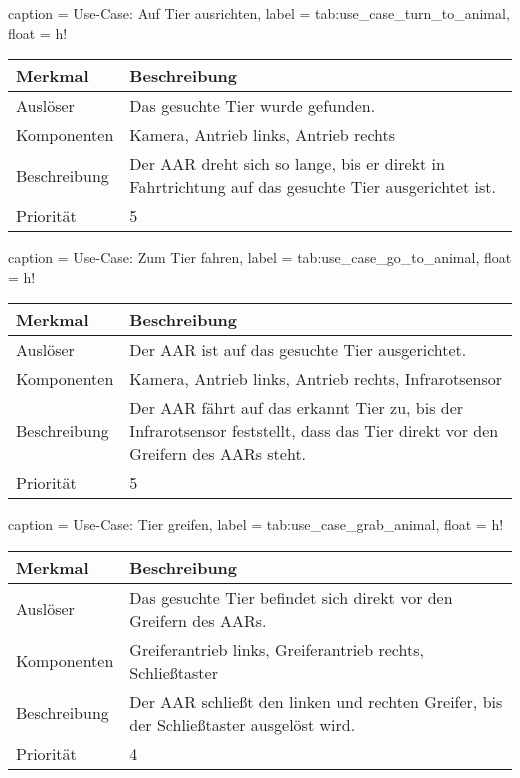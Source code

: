 \begin{dhbwtable}{%
    caption	= Use-Case: Auf Tier ausrichten,
    label	= tab:use_case_turn_to_animal,
    float   = h!
}
    \begin{tabularx}{\textwidth}{lX}
        \toprule
        \textbf{Merkmal}     & \textbf{Beschreibung}  \\\midrule
        Auslöser     & Das gesuchte Tier wurde gefunden.\\
        Komponenten  & Kamera, Antrieb links, Antrieb rechts\\
        Beschreibung & Der \ac{AAR} dreht sich so lange, bis er direkt in Fahrtrichtung auf das gesuchte Tier ausgerichtet ist.\\
        Priorität    & 5 \\\bottomrule
    \end{tabularx}    
\end{dhbwtable}

\begin{dhbwtable}{%
    caption	= Use-Case: Zum Tier fahren,
    label	= tab:use_case_go_to_animal,
    float   = h!
}
    \begin{tabularx}{\textwidth}{lX}
        \toprule
        \textbf{Merkmal}     & \textbf{Beschreibung}  \\\midrule
        Auslöser     & Der \ac{AAR} ist auf das gesuchte Tier ausgerichtet.\\
        Komponenten  & Kamera, Antrieb links, Antrieb rechts, Infrarotsensor\\
        Beschreibung & Der \ac{AAR} fährt auf das erkannt Tier zu, bis der Infrarotsensor feststellt, dass das Tier direkt vor den Greifern des \acp{AAR} steht.\\
        Priorität    & 5 \\\bottomrule
    \end{tabularx}    
\end{dhbwtable}

\begin{dhbwtable}{%
    caption	= Use-Case: Tier greifen,
    label	= tab:use_case_grab_animal,
    float   = h!
}
    \begin{tabularx}{\textwidth}{lX}
        \toprule
        \textbf{Merkmal}     & \textbf{Beschreibung}  \\\midrule
        Auslöser     & Das gesuchte Tier befindet sich direkt vor den Greifern des \acp{AAR}. \\
        Komponenten  & Greiferantrieb links, Greiferantrieb rechts, Schließtaster \\
        Beschreibung & Der \ac{AAR} schließt den linken und rechten Greifer, bis der Schließtaster ausgelöst wird.\\
        Priorität    & 4 \\\bottomrule
    \end{tabularx}    
\end{dhbwtable}

